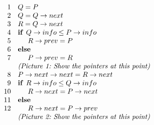 \documentclass[a4paper,12pt]{article}
\begin{document}
\[
\begin{array}{rl}
1 & Q = P\\
2 & Q = Q\rightarrow next\\
3 & R = Q\rightarrow next\\
4 & \text{\textbf{if\ }} Q\rightarrow info \leq P\rightarrow info\\
5 & \hspace{.5cm} R\rightarrow prev = P\\
6 & \text{\textbf{else\ }}\\
7 & \hspace{.5cm} P\rightarrow  prev = R\\
  & \text{\em (Picture\ 1:\ Show\ the\ pointers\ at\ this\ point) }\\
8 & P\rightarrow next\rightarrow next = R\rightarrow next\\
9 & \text{\textbf{if\ }} R\rightarrow info \leq Q\rightarrow info\\
10 & \hspace{.5cm} R\rightarrow next = P\rightarrow next\\
11 & \text{\textbf{else\ }}\\
12 & \hspace{.5cm} R\rightarrow next = P\rightarrow prev\\
  & \text{\em (Picture\ 2:\ Show\ the\ pointers\ at\ this\ point) }\\

\end{array}
\]
\end{document}
